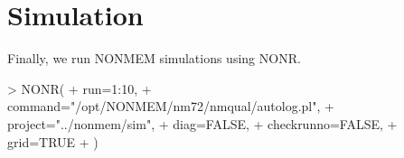 \section{Simulation}
Finally, we run NONMEM simulations using NONR.
\begin{Schunk}
\begin{Sinput}
> NONR(
+ 	run=1:10,
+ 	command="/opt/NONMEM/nm72/nmqual/autolog.pl",
+ 	project="../nonmem/sim",
+ 	diag=FALSE,
+ 	checkrunno=FALSE,
+ 	grid=TRUE
+ )
\end{Sinput}
\end{Schunk}

